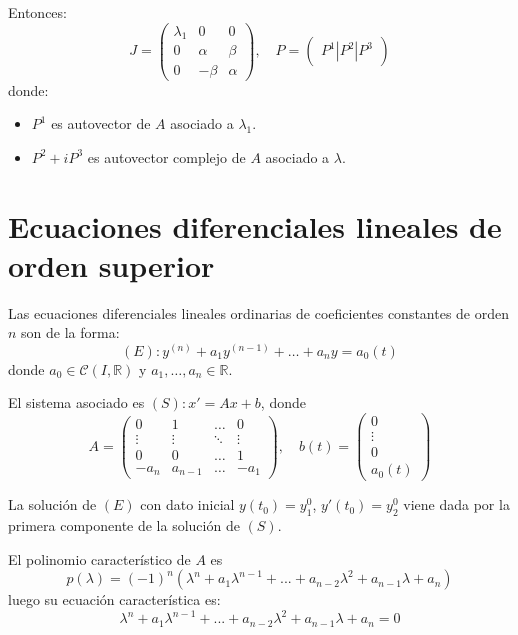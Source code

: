 \begin{enumerate}
          Entonces:
          $$J = \begin{pmatrix}
                  \lambda_1 & 0      & 0      \\
                  0         & \alpha & \beta  \\
                  0         & -\beta & \alpha
              \end{pmatrix}, \quad
              P = \begin{pmatrix}
                  P^1 | P^2 | P^3
              \end{pmatrix}$$
          donde:
          \begin{itemize}
              \item $P^1$ es autovector de $A$ asociado a $\lambda_1$.
              \item $P^2 + iP^3$ es autovector complejo de $A$ asociado a $\lambda$.
          \end{itemize}
\end{enumerate}

\section{Ecuaciones diferenciales lineales de orden superior}
Las ecuaciones diferenciales lineales ordinarias de coeficientes constantes de orden $n$ son de la forma:
$$(E): y^{(n)} + a_1y^{(n-1)} + \dots + a_ny = a_0(t)$$
donde $a_0 \in \mathcal{C}(I, \mathbb{R})$ y $a_1, \dots, a_n \in \mathbb{R}$.

El sistema asociado es $(S): x' = Ax + b$, donde
$$A = \begin{pmatrix}
        0      & 1       & \dots  & 0      \\
        \vdots & \vdots  & \ddots & \vdots \\
        0      & 0       & \dots  & 1      \\
        -a_n   & a_{n-1} & \dots  & -a_1
    \end{pmatrix}, \quad
    b(t) = \begin{pmatrix}
        0      \\
        \vdots \\
        0      \\
        a_0(t)
    \end{pmatrix}$$

La solución de $(E)$ con dato inicial $y(t_0) = y_1^0$, $y'(t_0) = y_2^0$ viene dada por la primera componente de la solución de $(S)$.

El polinomio característico de $A$ es
$$p(\lambda) = (-1)^n(\lambda^n + a_1\lambda^{n-1} + ... + a_{n-2}\lambda^2 + a _{n-1}\lambda + a_n)$$
luego su ecuación característica es:
$$\lambda^n + a_1\lambda^{n-1} + ... + a_{n-2}\lambda^2 + a _{n-1}\lambda + a_n = 0$$


